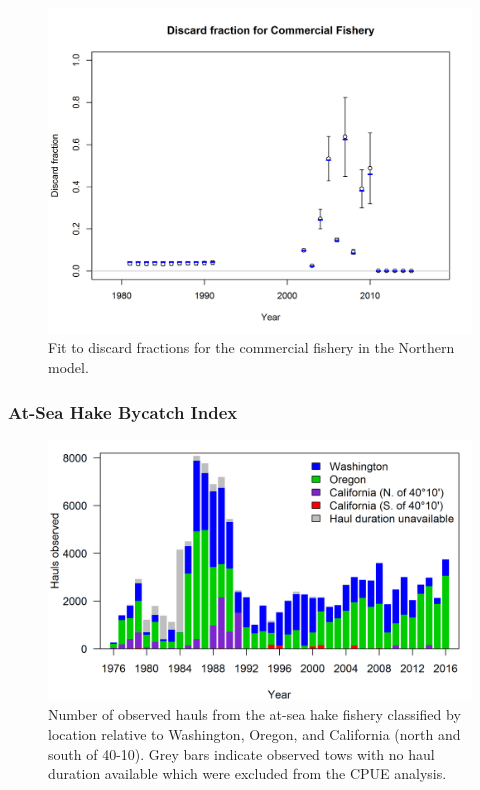 \documentclass[12pt,]{article}
\begin{document}
\FloatBarrier

\newpage

\begin{figure}[htbp]
\centering
\includegraphics{r4ss/plots_mod1/discard_dataCommercial Fishery.png}
\caption{Fit to discard fractions for the commercial fishery in the
Northern model.\label{fig:r4ss_discard_fits.N}}
\end{figure}

\FloatBarrier

\newpage

\subsubsection{At-Sea Hake Bycatch
Index}\label{at-sea-hake-bycatch-index}

\begin{figure}[htbp]
\centering
\includegraphics{Figures/ASHOP_hauls_observed_by_state.png}
\caption{Number of observed hauls from the at-sea hake fishery
classified by location relative to Washington, Oregon, and California
(north and south of 40-10). Grey bars indicate observed tows with no
haul duration available which were excluded from the CPUE
analysis.\label{fig:ASHOP_X1}}
\end{figure}
\end{document}
